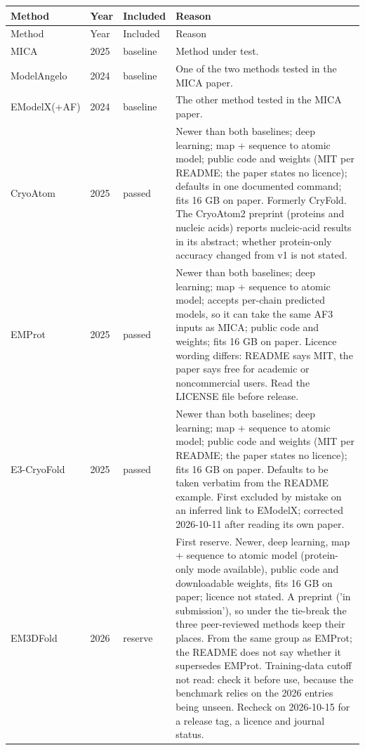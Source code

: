 \begin{longtable}{@{}p{3.0cm}p{0.9cm}p{1.5cm}p{9.0cm}@{}}
\toprule
Method & Year & Included & Reason \\
\midrule
\endfirsthead
\toprule
Method & Year & Included & Reason \\
\midrule
\endhead
\bottomrule
\endlastfoot
MICA & 2025 & baseline & {\footnotesize Method under test.} \\
ModelAngelo & 2024 & baseline & {\footnotesize One of the two methods tested in the MICA paper.} \\
EModelX(+AF) & 2024 & baseline & {\footnotesize The other method tested in the MICA paper.} \\
CryoAtom & 2025 & passed & {\footnotesize Newer than both baselines; deep learning; map + sequence to atomic model; public code and weights (MIT per README; the paper states no licence); defaults in one documented command; fits 16 GB on paper. Formerly CryFold. The CryoAtom2 preprint (proteins and nucleic acids) reports nucleic-acid results in its abstract; whether protein-only accuracy changed from v1 is not stated.} \\
EMProt & 2025 & passed & {\footnotesize Newer than both baselines; deep learning; map + sequence to atomic model; accepts per-chain predicted models, so it can take the same AF3 inputs as MICA; public code and weights; fits 16 GB on paper. Licence wording differs: README says MIT, the paper says free for academic or noncommercial users. Read the LICENSE file before release.} \\
E3-CryoFold & 2025 & passed & {\footnotesize Newer than both baselines; deep learning; map + sequence to atomic model; public code and weights (MIT per README; the paper states no licence); fits 16 GB on paper. Defaults to be taken verbatim from the README example. First excluded by mistake on an inferred link to EModelX; corrected 2026-10-11 after reading its own paper.} \\
EM3DFold & 2026 & reserve & {\footnotesize First reserve. Newer, deep learning, map + sequence to atomic model (protein-only mode available), public code and downloadable weights, fits 16 GB on paper; licence not stated. A preprint ('in submission'), so under the tie-break the three peer-reviewed methods keep their places. From the same group as EMProt; the README does not say whether it supersedes EMProt. Training-data cutoff not read: check it before use, because the benchmark relies on the 2026 entries being unseen. Recheck on 2026-10-15 for a release tag, a licence and journal status.} \\

\end{longtable}
